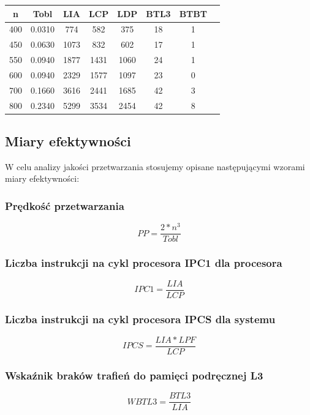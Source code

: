 \documentclass[10pt,a4paper]{article}
\begin{document}
\begin{center}
	\begin{tabular}{ |c|c|c|c|c|c|c|c| }
		\hline
		n   & Tobl   & LIA  & LCP  & LDP  & BTL3 & BTBT \\
		\hline
		400 & 0.0310 & 774  & 582  & 375  & 18   & 1    \\
		\hline
		450 & 0.0630 & 1073 & 832  & 602  & 17   & 1    \\
		\hline
		550 & 0.0940 & 1877 & 1431 & 1060 & 24   & 1    \\
		\hline
		600 & 0.0940 & 2329 & 1577 & 1097 & 23   & 0    \\
		\hline
		700 & 0.1660 & 3616 & 2441 & 1685 & 42   & 3    \\
		\hline
		800 & 0.2340 & 5299 & 3534 & 2454 & 42   & 8    \\
		\hline
	\end{tabular}
\end{center}

\subsection{Miary efektywności}
W celu analizy jakości przetwarzania stosujemy opisane następującymi
wzorami miary efektywności:\\
\subsubsection*{Prędkość przetwarzania}
\begin{equation}
	PP = \frac{2 * n^3}{Tobl}
\end{equation}
\subsubsection*{Liczba instrukcji na cykl procesora IPC1 dla procesora}
\begin{equation}
	IPC1 = \frac{LIA}{LCP}
\end{equation}
\subsubsection*{Liczba instrukcji na cykl procesora IPCS dla systemu}
\begin{equation}
	IPCS = \frac{LIA*LPF}{LCP}
\end{equation}
\subsubsection*{Wskaźnik braków trafień do pamięci podręcznej L3}
\begin{equation}
	WBTL3 = \frac{BTL3}{LIA}
\end{equation}
\end{document}
